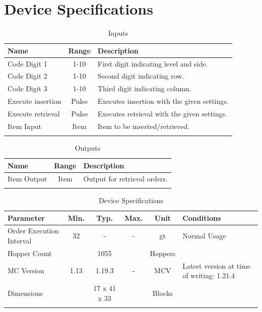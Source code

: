 \documentclass[10pt]{datasheet}
\begin{document}
\onecolumn

\section{Device Specifications}

\begin{table}[H]
    \caption{Inputs}
    \begin{tabularx}{\textwidth}{l | c | X}
        \thickhline
        \textbf{Name} & \textbf{Range} & \textbf{Description} \\
        \hline
        Code Digit 1 & 1-10 & First digit indicating level and side. \\
        Code Digit 2 & 1-10 & Second digit indicating row. \\
        Code Digit 3 & 1-10 & Third digit indicating column. \\
        \hline
        Execute insertion & Pulse & Executes insertion with the given settings. \\
        \hline
        Execute retrieval & Pulse & Executes retrieval with the given settings. \\
        \hline
        Item Input & Item & Item to be inserted/retrieved. \\
        \thickhline
\end{tabularx}
\end{table}

\begin{table}[H]
    \caption{Outputs}
    \begin{tabularx}{\textwidth}{l | c | X}
        \thickhline
        \textbf{Name} & \textbf{Range} & \textbf{Description} \\
        \hline
        Item Output & Item & Output for retrieval orders. \\
        \thickhline
\end{tabularx}
\end{table}

\begin{table}[H]
    \caption{Device Specifications}
    \begin{tabularx}{\textwidth}{l | c c c | c | X}
        \thickhline
        \textbf{Parameter} & \textbf{Min.} & \textbf{Typ.} & \textbf{Max.} &
        \textbf{Unit} & \textbf{Conditions} \\
        \hline
        Order Execution Interval & 32 & - & - & gt & Normal Usage\\
        \hline
        Hopper Count & & 1055 & & Hoppers & \\
        \hline
        MC Version & 1.13 & 1.19.3 & - & MCV & Latest version at time of writing: 1.21.4\\
        \hline
        Dimensions & & 17 x 41 x 33 & & Blocks & \\
        \thickhline
\end{tabularx}
\end{table}
\end{document}
